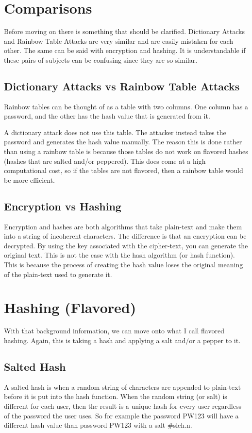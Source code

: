 \documentclass[12pt]{article}
\begin{document}
\section{Comparisons}
Before moving on there is something that should be clarified. Dictionary Attacks and Rainbow Table Attacks are very similar and are easily mistaken for each other. The same can be said with encryption and hashing. It is understandable if these pairs of subjects can be confusing since they are so similar. 

\adjustwidth{3em}{0pt}
\subsection{Dictionary Attacks vs Rainbow Table Attacks}
Rainbow tables can be thought of as a table with two columns. One column has a password, and the other has the hash value that is generated from it. 

A dictionary attack does not use this table. The attacker instead takes the password and generates the hash value manually. The reason this is done rather than using a rainbow table is because those tables do not work on flavored hashes (hashes that are salted and/or peppered). This does come at a high computational cost, so if the tables are not flavored, then a rainbow table would be more efficient. 

\subsection{Encryption vs Hashing}
Encryption and hashes are both algorithms that take plain-text and make them into a string of incoherent characters. The difference is that an encryption can be decrypted. By using the key associated with the cipher-text, you can generate the original text. This is not the case with the hash algorithm (or hash function). This is because the process of creating the hash value loses the original meaning of the plain-text used to generate it. 

\endadjustwidth

\section{Hashing (Flavored)}
With that background information, we can move onto what I call flavored hashing. Again, this is taking a hash and applying a salt and/or a pepper to it. 

\adjustwidth{3em}{0pt}
\subsection{Salted Hash}
A salted hash is when a random string of characters are appended to plain-text before it is put into the hash function. When the random string (or salt) is different for each user, then the result is a unique hash for every user regardless of the password the user uses. So for example the password PW123 will have a different hash value than password PW123 with a salt \#sleh.n.
\end{document}
